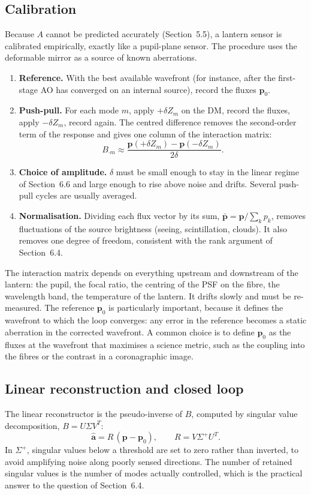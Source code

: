 \documentclass[11pt,a4paper]{article}
\newcommand{\pvec}{\mathbf{p}}
\begin{document}
\subsection{Calibration}
Because $A$ cannot be predicted accurately (Section~5.5), a lantern sensor is calibrated empirically, exactly like a pupil-plane sensor. The procedure uses the deformable mirror as a source of known aberrations.
\begin{enumerate}
\item \textbf{Reference.} With the best available wavefront (for instance, after the first-stage AO has converged on an internal source), record the fluxes $\pvec_0$.
\item \textbf{Push-pull.} For each mode $m$, apply $+\delta Z_m$ on the DM, record the fluxes, apply $-\delta Z_m$, record again. The centred difference removes the second-order term of the response and gives one column of the interaction matrix:
\begin{equation}
B_{\cdot m} \approx \frac{\pvec(+\delta Z_m) - \pvec(-\delta Z_m)}{2\delta}.
\label{eq:pushpull}
\end{equation}
\item \textbf{Choice of amplitude.} $\delta$ must be small enough to stay in the linear regime of Section~6.6 and large enough to rise above noise and drifts. Several push-pull cycles are usually averaged.
\item \textbf{Normalisation.} Dividing each flux vector by its sum, $\bar{\pvec} = \pvec/\sum_k p_k$, removes fluctuations of the source brightness (seeing, scintillation, clouds). It also removes one degree of freedom, consistent with the rank argument of Section~6.4.
\end{enumerate}
The interaction matrix depends on everything upstream and downstream of the lantern: the pupil, the focal ratio, the centring of the PSF on the fibre, the wavelength band, the temperature of the lantern. It drifts slowly and must be re-measured. The reference $\pvec_0$ is particularly important, because it defines the wavefront to which the loop converges: any error in the reference becomes a static aberration in the corrected wavefront. A common choice is to define $\pvec_0$ as the fluxes at the wavefront that maximises a science metric, such as the coupling into the fibres or the contrast in a coronagraphic image.

\subsection{Linear reconstruction and closed loop}
The linear reconstructor is the pseudo-inverse of $B$, computed by singular value decomposition, $B = U\Sigma V^T$:
\begin{equation}
\hat{\mathbf{a}} = R\,(\pvec - \pvec_0),
\qquad
R = V\Sigma^+ U^T.
\label{eq:reconstructor}
\end{equation}
In $\Sigma^+$, singular values below a threshold are set to zero rather than inverted, to avoid amplifying noise along poorly sensed directions. The number of retained singular values is the number of modes actually controlled, which is the practical answer to the question of Section~6.4.
\end{document}
